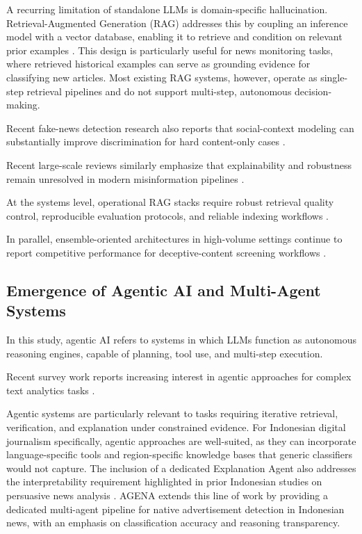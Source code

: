 \documentclass{ieeeaccess}
\begin{document}
A recurring limitation of standalone LLMs is domain-specific hallucination. Retrieval-Augmented Generation (RAG) addresses this by coupling an inference model with a vector database, enabling it to retrieve and condition on relevant prior examples \cite{b25}. This design is particularly useful for news monitoring tasks, where retrieved historical examples can serve as grounding evidence for classifying new articles. Most existing RAG systems, however, operate as single-step retrieval pipelines and do not support multi-step, autonomous decision-making.

Recent fake-news detection research also reports that social-context modeling can substantially improve discrimination for hard content-only cases \cite{b67}.

Recent large-scale reviews similarly emphasize that explainability and robustness remain unresolved in modern misinformation pipelines \cite{b50, b57}.

At the systems level, operational RAG stacks require robust retrieval quality control, reproducible evaluation protocols, and reliable indexing workflows \cite{b52, b57}.

In parallel, ensemble-oriented architectures in high-volume settings continue to report competitive performance for deceptive-content screening workflows \cite{b52}.

\subsection{Emergence of Agentic AI and Multi-Agent Systems}
In this study, agentic AI refers to systems in which LLMs function as autonomous reasoning engines, capable of planning, tool use, and multi-step execution.

Recent survey work reports increasing interest in agentic approaches for complex text analytics tasks \cite{b10}.

Agentic systems are particularly relevant to tasks requiring iterative retrieval, verification, and explanation under constrained evidence. For Indonesian digital journalism specifically, agentic approaches are well-suited, as they can incorporate language-specific tools and region-specific knowledge bases that generic classifiers would not capture. The inclusion of a dedicated Explanation Agent also addresses the interpretability requirement highlighted in prior Indonesian studies on persuasive news analysis \cite{b21}. AGENA extends this line of work by providing a dedicated multi-agent pipeline for native advertisement detection in Indonesian news, with an emphasis on classification accuracy and reasoning transparency.
\end{document}
